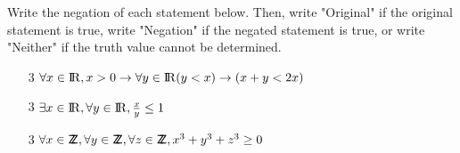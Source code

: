 %
%
\item [9]  Write the negation of each statement below. Then, write "Original" if the original statement is true, write "Negation" if the negated statement is true, or write "Neither" if the truth value cannot be determined.

\begin{enumerate}
    \item[3] $\forall x\in\R, x > 0 \rightarrow \forall y\in\R (y<x) \rightarrow (x+y<2x)$
    \vspace{2.5in}
    \item[3] $\exists x\in\R, \forall y\in\R, \frac{x}{y} \leq 1$
    \vspace{2.5in}
    \item[3] $\forall x\in\Z, \forall y\in\Z, \forall z\in\Z, x^3 + y^3 + z^3\geq 0$
    \vspace{2.5in}
\end{enumerate}
  
